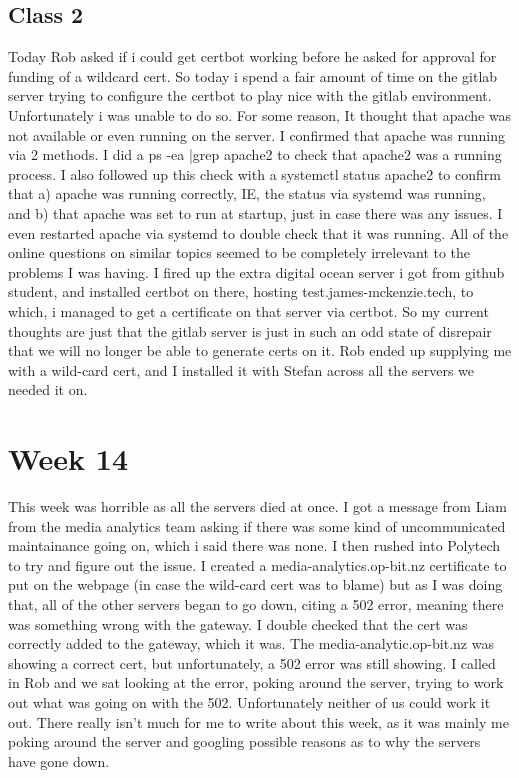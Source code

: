 \documentclass{article}
\begin{document}
\subsection{Class 2}
Today Rob asked if i could get certbot working before he asked for approval for funding of a wildcard cert. So today i spend a fair amount of time on the gitlab
server trying to configure the certbot to play nice with the gitlab environment. Unfortunately i was unable to do so. For some reason, It thought that apache was not
available or even running on the server. I confirmed that apache was running via 2 methods. I did a ps -ea |grep apache2 to check that apache2 was a running process.
I also followed up this check with a systemctl status apache2 to confirm that a) apache was running correctly, IE, the status via systemd was running, and b) that 
apache was set to run at startup, just in case there was any issues. I even restarted apache via systemd to double check that it was running. All of the online
questions on similar topics seemed to be completely irrelevant to the problems I was having. I fired up the extra digital ocean server i got from github student, and
installed certbot on there, hosting test.james-mckenzie.tech, to which, i managed to get a certificate on that server via certbot. So my current thoughts are just
that the gitlab server is just in such an odd state of disrepair that we will no longer be able to generate certs on it. Rob ended up supplying me with a wild-card cert, and I installed it with Stefan across all the servers we needed it on. 
\section{Week 14}
This week was horrible as all the servers died at once. I got a message from Liam from the media analytics team asking if there was some kind of uncommunicated
maintainance going on, which i said there was none. I then rushed into Polytech to try and figure out the issue. I created a media-analytics.op-bit.nz certificate to
put on the webpage (in case the wild-card cert was to blame) but as I was doing that, all of the other servers began to go down, citing a 502 error, meaning there was
something wrong with the gateway. I double checked that the cert was correctly added to the gateway, which it was. The media-analytic.op-bit.nz was showing a correct
cert, but unfortunately, a 502 error was still showing. I called in Rob and we sat looking at the error, poking around the server, trying to work out what was going
on with the 502. Unfortunately neither of us could work it out. There really isn't much for me to write about this week, as it was mainly me poking around the server
and googling possible reasons as to why the servers have gone down.
\end{document}
